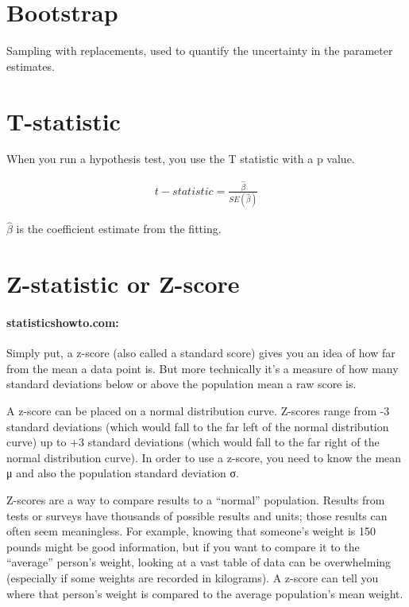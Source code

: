 \documentclass[a4paper, 12pt]{report}
\begin{document}
\section{Bootstrap}
Sampling with replacements, used to quantify the uncertainty in the parameter estimates.

\section{T-statistic}
When you run a hypothesis test, you use the T statistic with a p value. 

\begin{align}
	t-statistic = \frac{\hat{\beta}}{SE(\hat{\beta})}
\end{align}

$\hat{\beta}$ is the coefficient estimate from the fitting.

\section{Z-statistic or Z-score}
\paragraph{statisticshowto.com:} Simply put, a z-score (also called a standard score) gives you an idea of how far from the mean a data point is. But more technically it’s a measure of how many standard deviations below or above the population mean a raw score is.

A z-score can be placed on a normal distribution curve. Z-scores range from -3 standard deviations (which would fall to the far left of the normal distribution curve) up to +3 standard deviations (which would fall to the far right of the normal distribution curve). In order to use a z-score, you need to know the mean μ and also the population standard deviation σ.

Z-scores are a way to compare results to a “normal” population. Results from tests or surveys have thousands of possible results and units; those results can often seem meaningless. For example, knowing that someone’s weight is 150 pounds might be good information, but if you want to compare it to the “average” person’s weight, looking at a vast table of data can be overwhelming (especially if some weights are recorded in kilograms). A z-score can tell you where that person’s weight is compared to the average population’s mean weight.
\end{document}
